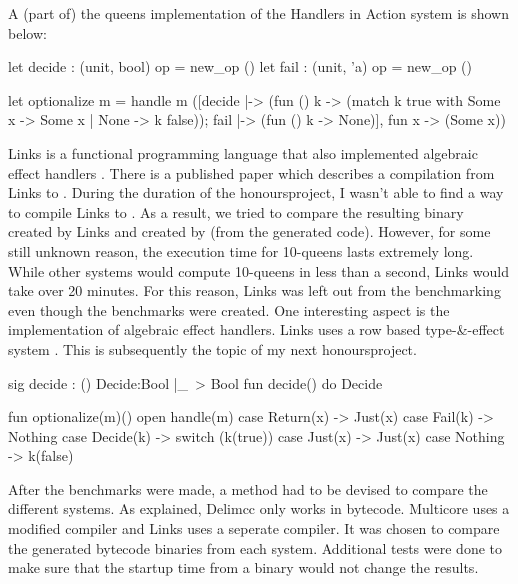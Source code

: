 A (part of) the queens implementation of the Handlers in Action system is shown below:
\begin{ocamllisting}
let decide : (unit, bool) op = new_op ()
let fail : (unit, 'a) op = new_op ()

let optionalize m =
  handle m
  ([decide |-> (fun () k -> (match k true with Some x -> Some x | None -> k false));
  fail |-> (fun () k -> None)],
   fun x -> (Some x))
\end{ocamllisting}

Links is a functional programming language that also implemented algebraic effect handlers \cite{linkslang}. There is a published paper which describes a compilation from Links to \ocaml \cite{links}. During the duration of the honoursproject, I wasn't able to find a way to compile Links to \ocaml. As a result, we tried to compare the resulting binary created by Links and created by \ocaml (from the generated \eff code). However, for some still unknown reason, the execution time for 10-queens lasts extremely long. While other systems would compute 10-queens in less than a second, Links would take over 20 minutes. For this reason, Links was left out from the benchmarking even though the benchmarks were created. One interesting aspect is the implementation of algebraic effect handlers. Links uses a row based type-\&-effect system \cite{Hillerstrom:2016:LER:2976022.2976033}. This is subsequently the topic of my next honoursproject. 
\begin{linkslisting}
sig decide : () {Decide:Bool |_}~> Bool
fun decide() { do Decide }

fun optionalize(m)() {
  open handle(m) {
     case Return(x) -> Just(x)
     case Fail(k) -> Nothing
     case Decide(k) ->
        switch (k(true)) {
            case Just(x) -> Just(x)
            case Nothing -> k(false)
        }
  }
}
\end{linkslisting}
After the benchmarks were made, a method had to be devised to compare the different systems. As explained, Delimcc only works in bytecode. Multicore \ocaml uses a modified compiler and Links uses a seperate compiler. It was chosen to compare the generated bytecode binaries from each system. Additional tests were done to make sure that the startup time from a binary would not change the results. 

